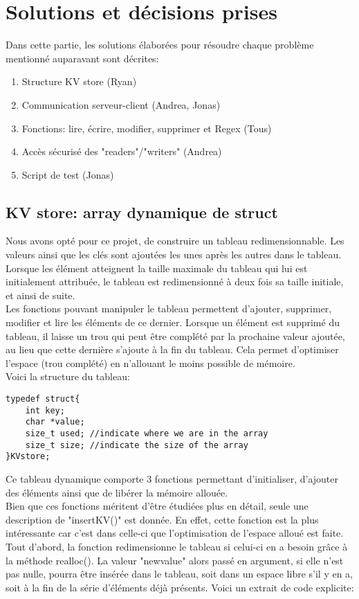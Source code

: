\documentclass[11pt,a4paper]{article}
\begin{document}
\section{Solutions et décisions prises}
Dans cette partie, les solutions élaborées pour résoudre chaque problème mentionné auparavant sont décrites:

\begin{enumerate}
\item Structure KV store (Ryan)
\item Communication serveur-client (Andrea, Jonas)
\item Fonctions: lire, écrire, modifier, supprimer  et Regex (Tous)
\item Accès sécurisé des "readers"/"writers" (Andrea)
\item Script de test (Jonas)
\end{enumerate}

\subsection{KV store: array dynamique de struct}
Nous avons opté pour ce projet, de construire un tableau redimensionnable. Les valeurs ainsi que les clés sont ajoutées les unes après les autres dans le tableau. Lorsque les élément atteignent la taille maximale du tableau qui lui est initialement attribuée, le tableau est redimensionné à deux fois sa taille initiale, et ainsi de suite.\\
Les fonctions pouvant manipuler le tableau permettent d'ajouter, supprimer, modifier et  lire les éléments de ce dernier. Lorsque un élément est supprimé du tableau, il laisse un trou qui peut être complété par la prochaine valeur ajoutée, au lieu que cette dernière s'ajoute à la fin du tableau. Cela permet d'optimiser l'espace (trou complété) en n'allouant le moins possible de mémoire.\\
Voici la structure du tableau:

\begin{lstlisting}
typedef struct{
    int key; 
    char *value;
    size_t used; //indicate where we are in the array
    size_t size; //indicate the size of the array
}KVstore;
\end{lstlisting}

Ce tableau dynamique comporte 3 fonctions permettant d'initialiser, d'ajouter des éléments ainsi que de libérer la mémoire allouée. \\
Bien que ces fonctions méritent d'être étudiées plus en détail, seule une description de "insertKV()" est donnée. En effet, cette fonction est la plus intéressante car c'est dans celle-ci que l'optimisation de l'espace alloué est faite.\\
Tout d'abord, la fonction redimensionne le tableau si celui-ci en a besoin  grâce à la méthode realloc(). La valeur "newvalue" alors passé en argument, si elle n'est pas nulle,  pourra être insérée dans le tableau, soit dans un espace libre s'il y en a, soit à la fin de la série d'éléments déjà présents. Voici un extrait de code explicite:
\end{document}
